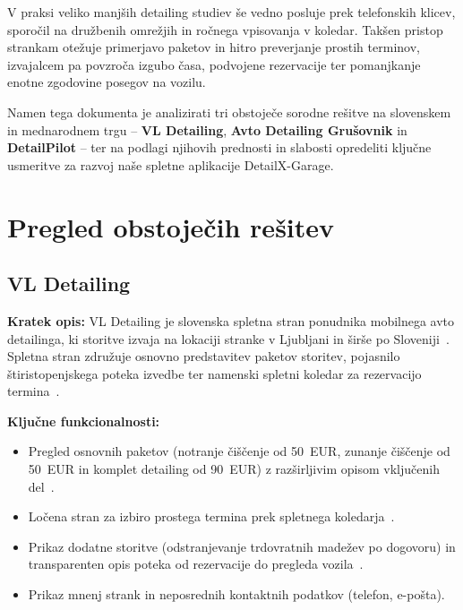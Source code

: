 \documentclass[11pt,a4paper]{article}
\begin{document}
V praksi veliko manjših detailing studiev še vedno posluje prek telefonskih klicev, sporočil na družbenih omrežjih in ročnega vpisovanja v koledar. Takšen pristop strankam otežuje primerjavo paketov in hitro preverjanje prostih terminov, izvajalcem pa povzroča izgubo časa, podvojene rezervacije ter pomanjkanje enotne zgodovine posegov na vozilu.

Namen tega dokumenta je analizirati tri obstoječe sorodne rešitve na slovenskem in mednarodnem trgu -- \textbf{VL Detailing}, \textbf{Avto Detailing Grušovnik} in \textbf{DetailPilot} -- ter na podlagi njihovih prednosti in slabosti opredeliti ključne usmeritve za razvoj naše spletne aplikacije DetailX-Garage.

\section{Pregled obstoječih rešitev}

\subsection{VL Detailing}

\textbf{Kratek opis:} VL Detailing je slovenska spletna stran ponudnika mobilnega avto detailinga, ki storitve izvaja na lokaciji stranke v Ljubljani in širše po Sloveniji~\cite{vl-domov}. Spletna stran združuje osnovno predstavitev paketov storitev, pojasnilo štiristopenjskega poteka izvedbe ter namenski spletni koledar za rezervacijo termina~\cite{vl-rezervacija}.

\textbf{Ključne funkcionalnosti:}
\begin{itemize}
  \item Pregled osnovnih paketov (notranje čiščenje od 50~EUR, zunanje čiščenje od 50~EUR in komplet detailing od 90~EUR) z razširljivim opisom vključenih del~\cite{vl-domov}.
  \item Ločena stran za izbiro prostega termina prek spletnega koledarja~\cite{vl-rezervacija}.
  \item Prikaz dodatne storitve (odstranjevanje trdovratnih madežev po dogovoru) in transparenten opis poteka od rezervacije do pregleda vozila~\cite{vl-domov}.
  \item Prikaz mnenj strank in neposrednih kontaktnih podatkov (telefon, e-pošta).
\end{itemize}
\end{document}
